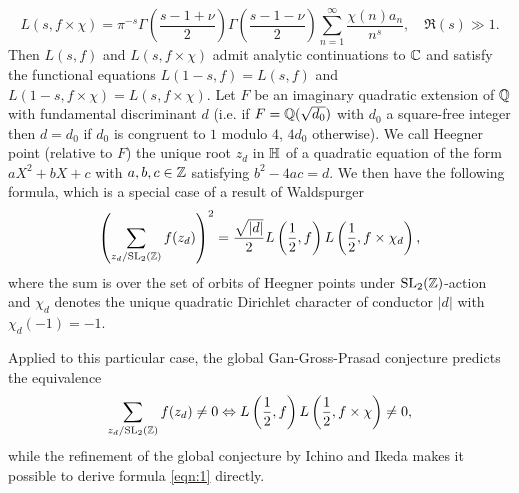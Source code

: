 \[
    L(s, f \times \chi) = \pi^{-s} \Gamma \left(\frac{s - 1 + \nu}{2}\right) \Gamma \left(\frac{s - 1 - \nu}{2}\right) \sum_{n=1}^{\infty} \frac{\chi(n) a_n}{n^s}, \quad \Re (s) \gg 1.
\]
Then $L(s, f)$ and $L(s, f \times \chi)$ admit analytic continuations to $\mathbb{C}$ and satisfy the functional equations $L(1 - s, f) = L(s, f)$ and $L(1 - s, f \times \chi) = L(s, f \times \chi )$.
Let $F$ be an imaginary quadratic extension of $\mathbb{Q}$ with fundamental discriminant $d$ (i.e. if $F = \mathbb{Q}(\sqrt{d_0})$ with $d_0$ a square-free integer then $d = d_0$ if $d_0$ is congruent to $1$ modulo $4$, $4d_0$ otherwise).
We call Heegner point (relative to $F$) the unique root $z_d$ in $\mathbb{H}$ of a quadratic equation of the form $aX^2 + bX + c$ with $a, b, c \in \mathbb{Z}$ satisfying $b^2 - 4ac = d$.
We then have the following formula, which is a special case of a result of Waldspurger \cite{waldspurger1985valeurs}
\begin{equation}
    \label{eqn:1}
\left(\sum_{z_d / \mathrm{SL}_2(\mathbb{Z})} f(z_d)\right)^2 = \frac{\sqrt{|d|}}{2} L\left(\frac{1}{2}, f\right) L\left(\frac{1}{2}, f \times \chi_d\right),
\end{equation}
where the sum is over the set of orbits of Heegner points under $\mathrm{SL}_2(\mathbb{Z})$-action and $\chi_d$ denotes the unique quadratic Dirichlet character of conductor $|d|$ with $\chi_d(-1) = -1$.

Applied to this particular case, the global Gan-Gross-Prasad conjecture predicts the equivalence
\[
    \sum_{z_d / \mathrm{SL}_2(\mathbb{Z})} f(z_d) \neq 0 \Leftrightarrow L\left(\frac{1}{2}, f\right) L\left(\frac{1}{2}, f \times \chi\right) \neq 0,
\]
while the refinement of the global conjecture by Ichino and Ikeda makes it possible to derive formula \eqref{eqn:1} directly.

